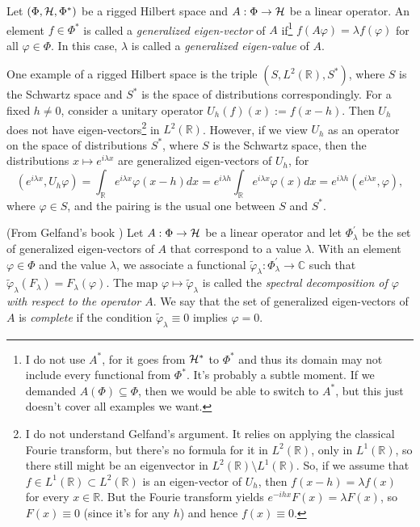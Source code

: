 \begin{definition}
Let $(\Phi, \mathcal{H}, \Phi^*)$ be a rigged Hilbert space and $A : \Phi \rightarrow \mathcal{H}$ be a linear operator. An element $f \in \Phi^*$ is called a \emph{generalized eigen-vector} of $A$ if\footnote{I do not use $A^*$, for it goes from $\mathcal{H}^*$ to $\Phi^*$ and thus its domain may not include every functional from $\Phi^*$. It's probably a subtle moment. If we demanded $A(\Phi) \subseteq \Phi$, then we would be able to switch to $A^*$, but this just doesn't cover all examples we want.} $f(A\varphi) = \lambda f(\varphi)$ for all $\varphi \in \Phi$. In this case, $\lambda$ is called a \emph{generalized eigen-value} of $A$.
\end{definition}
\begin{example}
One example of a rigged Hilbert space is the triple $(S,L^2(\mathbb R), S^*)$, where $S$ is the Schwartz space and $S^*$ is the space of distributions correspondingly. For a fixed $h \neq 0$, consider a unitary operator $U_h(f) (x) := f(x-h)$. Then $U_h$ does not have eigen-vectors\footnote{I do not understand Gelfand's argument. It relies on applying the classical Fourie transform, but there's no formula for it in $L^2(\mathbb R)$, only in $L^1(\mathbb R)$, so there still might be an eigenvector in $L^2(\mathbb R) \setminus L^1(\mathbb R)$. So, if we assume that $f \in L^1(\mathbb R) \subset L^2(\mathbb R)$ is an eigen-vector of $U_h$, then $f(x-h) = \lambda f(x)$ for every $x \in \mathbb R$. But the Fourie transform yields $e^{-ihx}F(x) = \lambda F(x)$, so $F(x) \equiv 0$ (since it's for any $h$) and hence $f(x) \equiv 0$.} in $L^2(\mathbb R)$. However, if we view $U_h$ as an operator on the space of distributions $S^*$, where $S$ is the Schwartz space, then the distributions $x \mapsto e^{i\lambda x}$ are generalized eigen-vectors of $U_h$, for
\[
(e^{i\lambda x},U_h\varphi) = \int_{\mathbb R} e^{i\lambda x} \varphi(x-h)dx = e^{i\lambda h} \int_{\mathbb R}e^{i\lambda x} \varphi(x) dx = e^{i\lambda h}(e^{i\lambda x},\varphi),
\]
where $\varphi \in S$, and the pairing is the usual one between $S$ and $S^*$. 
\end{example}
\begin{definition}
(From Gelfand's book \cite{gelfand}) Let $A : \Phi \rightarrow \mathcal{H}$ be a linear operator and let $\Phi_{\lambda}^\prime$ be the set of generalized eigen-vectors of $A$ that correspond to a value $\lambda$. With an element $\varphi \in \Phi$ and the value $\lambda$, we associate a functional $\tilde{\varphi}_{\lambda} : \Phi_{\lambda}^\prime \rightarrow \mathbb C$ such that $\tilde{\varphi}_{\lambda}(F_{\lambda}) = F_{\lambda}(\varphi)$. The map $\varphi \mapsto \tilde{\varphi}_{\lambda}$ is called the \emph{spectral decomposition of $\varphi$ with respect to the operator $A$}. We say that the set of generalized eigen-vectors of $A$ is \emph{complete} if the condition $\tilde{\varphi}_{\lambda} \equiv 0$ implies $\varphi = 0$.
\end{definition}
